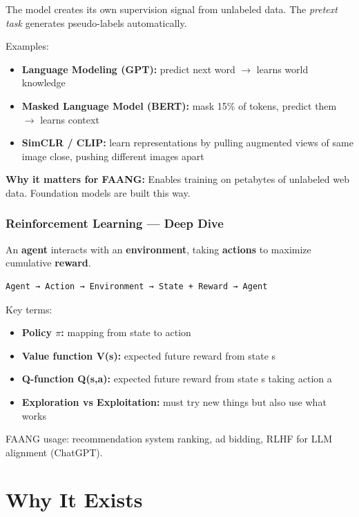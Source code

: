 \documentclass[11pt]{article}
\providecommand{\tightlist}{\setlength{\itemsep}{1pt}\setlength{\parskip}{0pt}}
\begin{document}
The model creates its own supervision signal from unlabeled data. The \emph{pretext task} generates pseudo-labels automatically.

Examples:

\begin{itemize}
\tightlist
\item
  \textbf{Language Modeling (GPT):} predict next word \(\rightarrow\) learns world knowledge
\item
  \textbf{Masked Language Model (BERT):} mask 15\% of tokens, predict them \(\rightarrow\) learns context
\item
  \textbf{SimCLR / CLIP:} learn representations by pulling augmented views of same image close, pushing different images apart
\end{itemize}

\textbf{Why it matters for FAANG:} Enables training on petabytes of unlabeled web data. Foundation models are built this way.

\subsubsection{Reinforcement Learning --- Deep Dive}\label{reinforcement-learning--deep-dive}

An \textbf{agent} interacts with an \textbf{environment}, taking \textbf{actions} to maximize cumulative \textbf{reward}.

\setcodelang{}

\begin{verbatim}
Agent → Action → Environment → State + Reward → Agent
\end{verbatim}

Key terms:

\begin{itemize}
\tightlist
\item
  \textbf{Policy \(\pi\):} mapping from state to action
\item
  \textbf{Value function V(s):} expected future reward from state s
\item
  \textbf{Q-function Q(s,a):} expected future reward from state s taking action a
\item
  \textbf{Exploration vs Exploitation:} must try new things but also use what works
\end{itemize}

FAANG usage: recommendation system ranking, ad bidding, RLHF for LLM alignment (ChatGPT).

\section{Why It Exists}\label{why-it-exists}
\end{document}
